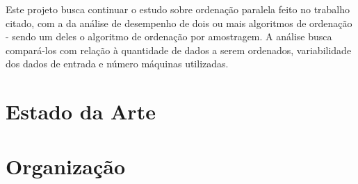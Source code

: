 Este projeto busca continuar o estudo sobre ordenação paralela feito no trabalho citado, com a da análise de desempenho de dois ou mais algoritmos de ordenação - sendo um deles o algoritmo de ordenação por amostragem. A análise busca compará-los com relação à quantidade de dados a serem ordenados, variabilidade dos dados de entrada e número máquinas utilizadas. 

\section{Estado da Arte}

\section{Organização }


